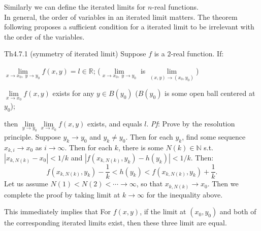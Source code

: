 \documentclass{article}
\begin{document}
\begin{Rmk}{}
    \textcolor{Df}{Similarly we can define the iterated limits for $n$-real functions.} \\
    \textcolor{Th}{In general, the order of variables in an iterated limit matters. The theorem following proposes a sufficient condition for a iterated limit to be irrelevant with the order of the variables.} 
\end{Rmk}

\begin{Th}{Th4.7.1 (symmetry of iterated limit)}
    Suppose $f$ is a $2$-real function. If:
    \begin{compactenum}
        \item $\lim\limits_{x\to x_0,\; y\to y_0} f(x,y) = l\in\mathbb{R}$; \textcolor{Df}{($\lim\limits_{x\to x_0,\; y\to y_0}$ is $\lim\limits_{(x,y)\to (x_0, y_0)}$)}
        \item $\lim\limits_{x\to x_0} f(x,y)$ exists for any $y\in B(y_0)$ ($B(y_0)$ is some open ball centered at $y_0$);
    \end{compactenum}
    then $\lim\limits_{y\to y_0}\lim\limits_{x\to x_0} f(x,y)$ exists, and equals $l$.
    \tcblower
    \textit{Pf}: Prove by the resolution principle. Suppose $y_k\rightarrow y_0$ and $y_k\neq y_0$. Then for each $y_k$, find some sequence $x_{k,i}\rightarrow x_0$ as $i\rightarrow\infty$. Then for each $k$, there is some $N(k)\in\mathbb{N}$ s.t. $|x_{k,N(k)}-x_0|<1/k$ and $|f(x_{k,N(k)}, y_k)-h(y_k)|<1/k$. Then:
    $$ f(x_{k,N(k)}, y_k)-\frac{1}{k} < h(y_k) < f(x_{k,N(k)}, y_k)+\frac{1}{k}. $$
    Let us assume $N(1)<N(2)<\cdots\rightarrow\infty$, so that $x_{k,N(k)}\rightarrow x_0$. Then we complete the proof by taking limit at $k\rightarrow\infty$ for the inequality above.
\end{Th}

\begin{Rmk}{}
    This immediately implies that \textcolor{Th}{For $f(x,y)$, if the limit at $(x_0,y_0)$ and both of the corresponding iterated limits exist, then these three limit are equal.}
\end{Rmk}
\end{document}

